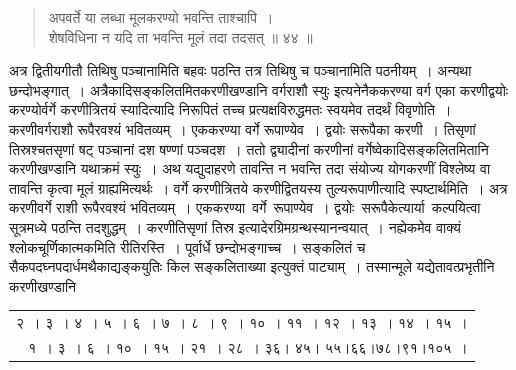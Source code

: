 \documentclass[11pt, openany]{book}
\begin{document}
{{\begin{quote}
\vspace{-5mm}
 अपवर्ते या लब्धा मूलकरण्यो भवन्ति ताश्चापि~। \\
 शेषविधिना न यदि ता भवन्ति मूलं तदा तदसत् ॥ ४४ ॥
\end{quote}

अत्र द्वितीयगीतौ तिथिषु पञ्चानामिति बहवः पठन्ति तत्र तिथिषु च
पञ्चानामिति पठनीयम्~। अन्यथा छन्दोभङ्गात्~। अत्रैकादिसङ्कलितमितकरणीखण्डानि वर्गराशौ स्युः इत्यनेनैककरण्या वर्ग एका करणीद्वयोः करण्योर्वर्गे करणीत्रितयं
स्यादित्यादि निरूपितं तच्च प्रत्यक्षविरुद्धमतः स्वयमेव तदर्थं विवृणोति~। करणीवर्गराशौ
\newpage
\noindent रूपैरवश्यं भवितव्यम्~। एककरण्या वर्गे रूपाण्येव~। द्वयोः सरूपैका करणी~। तिसृणां तिस्रश्चतसृणां षट् पञ्चानां दश षण्णां पञ्चदश~। ततो द्व्यादीनां
करणीनां वर्गेष्वेकादिसङ्कलितमितानि करणीखण्डानि यथाक्रमं स्युः~। अथ
यद्युदाहरणे तावन्ति न भवन्ति तदा संयोज्य योगकरणीं विश्लेष्य वा तावन्ति
कृत्वा मूलं ग्राह्यमित्यर्थः~। वर्गे करणीत्रितये करणीद्वितयस्य
तुल्यरूपाणीत्यादि स्पष्टार्थमिति~। अत्र करणीवर्गे राशी रूपैरवश्यं
भवितव्यम्~। एककरण्या \,वर्गे \,रूपाण्येव~। द्वयोः \,सरूपैकेत्यार्या \,कल्पयित्वा \,सूत्रमध्ये पठन्ति तदशुद्धम्~। करणीतिसृणां तिस्र
इत्यादेरग्रिमग्रन्थस्यानन्वयात्~। नह्येकमेव वाक्यं
श्लोकचूर्णिकात्मकमिति रीतिरस्ति~। पूर्वार्धे छन्दोभङ्गाच्च~। सङ्कलितं च
{\qt सैकपदघ्नपदार्धमथैकाद्यङ्कयुतिः किल सङ्कलिताख्या} इत्युक्तं पाट्याम्~।
तस्मान्मूले यद्येतावत्प्रभृतीनि करणीखण्डानि
\vspace{-2mm}

\begin{table}[h!]
    \centering\s\renewcommand{\arraystretch}{1.3}
    \begin{tabular}{r}
        २~। ३~। ४~। ५~। ६~। ७~। ८~। ९~। १०~। ११~। १२~। १३~। १४~। १५~। \\
१~। ३~। ६~। १०~। १५~। २१~। २८~। ३६। ४५। ५५।६६।७८।९१।१०५~।
    \end{tabular}
\end{table}
\vspace{-4mm}

}}
\end{document}
